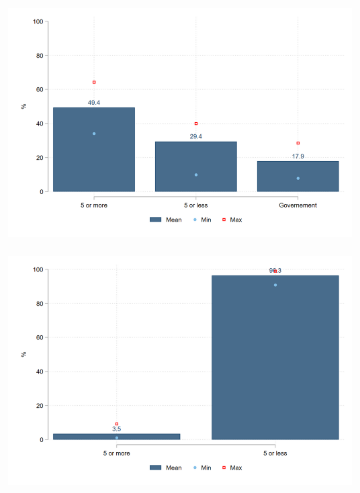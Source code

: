 \documentclass[english]{article}
\begin{document}
\begin{itemize}
\begin{figure}[htb!]
\begin{subfigure}{.5\textwidth}
  \centering
  \includegraphics[width=1\textwidth]{latex/figures/Snapshot/Salaried-firmsize.png}
  \label{fig:salariedfirmsize}
\end{subfigure}%
\begin{subfigure}{.5\textwidth}
  \centering
\includegraphics[width=1\textwidth]{latex/figures/Snapshot/Self employed-firmsize.png}
  \label{fig:selfirmsize}
\end{subfigure}


\end{figure}
\end{itemize}
\end{document}

